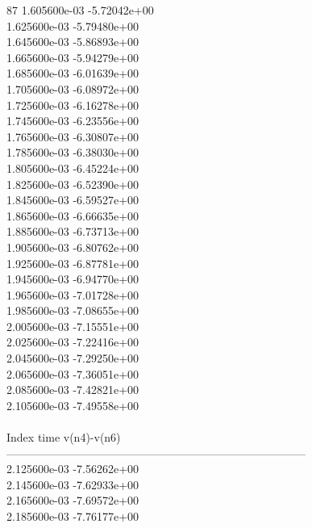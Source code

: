 87	1.605600e-03	-5.72042e+00	\\ 	1.625600e-03	-5.79480e+00	\\ 	1.645600e-03	-5.86893e+00	\\ 	1.665600e-03	-5.94279e+00	\\ 	1.685600e-03	-6.01639e+00	\\ 	1.705600e-03	-6.08972e+00	\\ 	1.725600e-03	-6.16278e+00	\\ 	1.745600e-03	-6.23556e+00	\\ 	1.765600e-03	-6.30807e+00	\\ 	1.785600e-03	-6.38030e+00	\\ 	1.805600e-03	-6.45224e+00	\\ 	1.825600e-03	-6.52390e+00	\\ 	1.845600e-03	-6.59527e+00	\\ 	1.865600e-03	-6.66635e+00	\\ 	1.885600e-03	-6.73713e+00	\\ 	1.905600e-03	-6.80762e+00	\\ 	1.925600e-03	-6.87781e+00	\\ 	1.945600e-03	-6.94770e+00	\\ 	1.965600e-03	-7.01728e+00	\\ 	1.985600e-03	-7.08655e+00	\\ 	2.005600e-03	-7.15551e+00	\\ 	2.025600e-03	-7.22416e+00	\\ 	2.045600e-03	-7.29250e+00	\\ 	2.065600e-03	-7.36051e+00	\\ 	2.085600e-03	-7.42821e+00	\\ 	2.105600e-03	-7.49558e+00	\\ \hline
\\ \hline
Index   time            v(n4)-v(n6)     \\ \hline
--------------------------------------------------------------------------------\\ 	2.125600e-03	-7.56262e+00	\\ 	2.145600e-03	-7.62933e+00	\\ 	2.165600e-03	-7.69572e+00	\\ 	2.185600e-03	-7.76177e+00	\\ \hline
